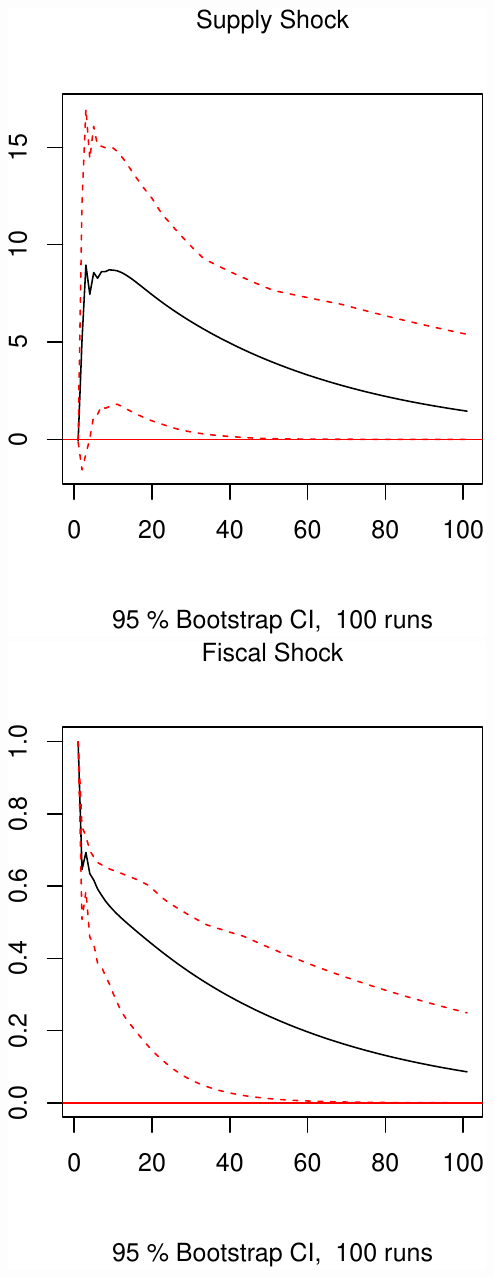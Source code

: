 \documentclass[11pt,preprint, authoryear]{elsarticle}
\numberwithin{equation}{section}
\numberwithin{figure}{section}
\numberwithin{table}{section}
\begin{document}
\includegraphics{TS_proj_files/figure-latex/unnamed-chunk-35-1.pdf}
\includegraphics{TS_proj_files/figure-latex/unnamed-chunk-35-2.pdf}
\end{document}
